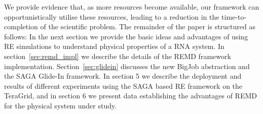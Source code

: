 \documentclass{rspublic}
\begin{document}
We provide evidence that, as more resources become
available, our framework can opportunistically utilise these resources,
leading to a reduction in the time-to-completion of the scientific
problem.  The remainder of the paper is structured as follows: In the
next section we provide the basic ideas and advantages of using RE
simulations to understand physical properties of a RNA system. In
section~\ref{sec:remd_impl} we describe the details of the REMD
framework implementation. Section~\ref{sec:glidein} discusses the new BigJob
abstraction and the SAGA Glide-In framework.  %
In section 5 we describe the deployment and results of different experiments
using the SAGA based RE framework on the TeraGrid, and in section 6 we
present data establishing the advantages of REMD for the physical
system under study. 



\end{document}
